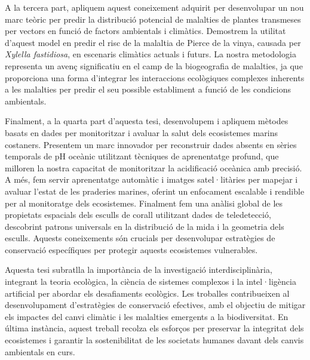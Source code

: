 A la tercera part, apliquem aquest coneixement adquirit per desenvolupar un
nou marc teòric per predir la distribució potencial de malalties de
plantes transmeses per vectors en funció de factors ambientals i
climàtics. Demostrem la utilitat d'aquest model en predir el risc de la
malaltia de Pierce de la vinya, causada per \textit{Xylella fastidiosa}, en
escenaris climàtics actuals i futurs. La nostra metodologia representa un
avenç significatiu en el camp de la biogeografia de malalties, ja que
proporciona una forma d'integrar les interaccions ecològiques complexes
inherents a les malalties per predir el seu possible establiment a
funció de les condicions ambientals.

Finalment, a la quarta part d'aquesta tesi, desenvolupem i apliquem
mètodes basats en dades per monitoritzar i avaluar la salut dels
ecosistemes marins costaners. Presentem un marc innovador per reconstruir
dades absents en sèries temporals de pH oceànic utilitzant tècniques de
aprenentatge profund, que milloren la nostra capacitat de monitoritzar la
acidificació oceànica amb precisió. A més, fem servir aprenentatge automàtic
i imatges satel·litàries per mapejar i avaluar l'estat de les praderies
marines,
oferint un enfocament escalable i rendible per al monitoratge dels
ecosistemes. Finalment fem una anàlisi global de les propietats
espacials dels esculls de corall utilitzant dades de teledetecció,
descobrint patrons universals en la distribució de la mida i la geometria
dels esculls. Aquests coneixements són crucials per desenvolupar
estratègies de conservació específiques per protegir aquests ecosistemes
vulnerables.

Aquesta tesi subratlla la importància de la investigació interdisciplinària,
integrant la teoria ecològica, la ciència de sistemes complexos i la
intel·ligència artificial per abordar els desafiaments ecològics. Les troballes
contribueixen al desenvolupament d'estratègies de conservació efectives, amb el
objectiu de mitigar els impactes del canvi climàtic i les malalties
emergents a la biodiversitat. En última instància, aquest treball recolza els
esforços per preservar la integritat dels ecosistemes i garantir la
sostenibilitat de les societats humanes davant dels canvis ambientals en
curs.

\vfill